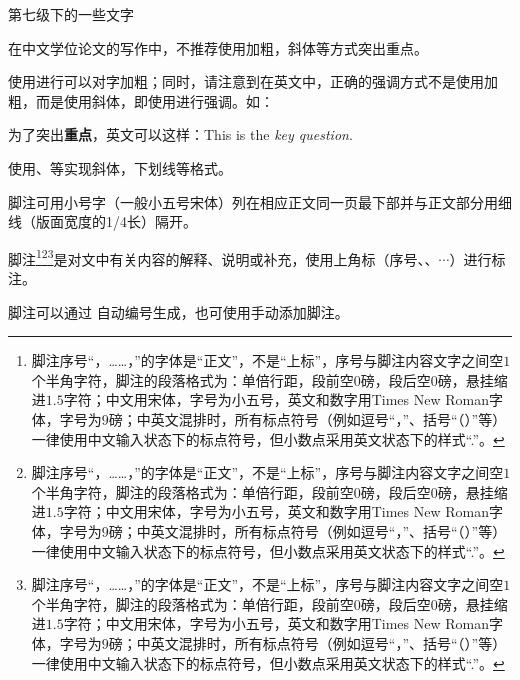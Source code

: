 第七级下的一些文字

\clearpage


在中文学位论文的写作中，不推荐使用加粗，斜体等方式突出重点。

使用进行可以对字加粗；同时，请注意到在英文中，正确的强调方式不是使用加粗，而是使用斜体，即使用进行强调。如：
\begin{texcode}[]{}
  为了突出\textbf{重点}，英文可以这样：This is the \emph{key question}.
\end{texcode}

使用、等实现斜体，下划线等格式。






\begin{tcolorbox}[colback=red!5!white,colframe=red!75!black]
  脚注可用小号字（一般小五号宋体）列在相应正文同一页最下部并与正文部分用细线（版面宽度的1/4长）隔开。
\end{tcolorbox}

脚注\footnote{脚注序号“，……，”的字体是“正文”，不是“上标”，序号与脚注内容文字之间空$1$个半角字符，脚注的段落格式为：单倍行距，段前空$0$磅，段后空$0$磅，悬挂缩进$1.5$字符；中文用宋体，字号为小五号，英文和数字用Times New Roman字体，字号为$9$磅；中英文混排时，所有标点符号（例如逗号“，”、括号“（）”等）一律使用中文输入状态下的标点符号，但小数点采用英文状态下的样式“.”。}\footnote{脚注序号“，……，”的字体是“正文”，不是“上标”，序号与脚注内容文字之间空$1$个半角字符，脚注的段落格式为：单倍行距，段前空$0$磅，段后空$0$磅，悬挂缩进$1.5$字符；中文用宋体，字号为小五号，英文和数字用Times New Roman字体，字号为$9$磅；中英文混排时，所有标点符号（例如逗号“，”、括号“（）”等）一律使用中文输入状态下的标点符号，但小数点采用英文状态下的样式“.”。}\footnote{脚注序号“，……，”的字体是“正文”，不是“上标”，序号与脚注内容文字之间空$1$个半角字符，脚注的段落格式为：单倍行距，段前空$0$磅，段后空$0$磅，悬挂缩进$1.5$字符；中文用宋体，字号为小五号，英文和数字用Times New Roman字体，字号为$9$磅；中英文混排时，所有标点符号（例如逗号“，”、括号“（）”等）一律使用中文输入状态下的标点符号，但小数点采用英文状态下的样式“.”。}是对文中有关内容的解释、说明或补充，使用上角标（序号、、$\cdots$）进行标注。

脚注可以通过 \clist{\footnote{}}自动编号生成，也可使用手动添加脚注。

